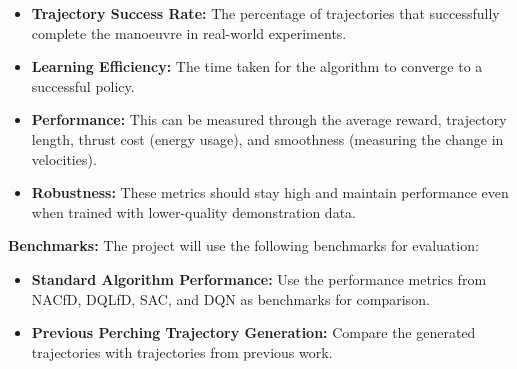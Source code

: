 \begin{itemize}
  \item \textbf{Trajectory Success Rate: } The percentage of trajectories that successfully complete the manoeuvre in real-world experiments.
  \item \textbf{Learning Efficiency: } The time taken for the algorithm to converge to a successful policy.
  \item \textbf{Performance: } This can be measured through the average reward, trajectory length, thrust cost (energy usage), and smoothness (measuring the change in velocities).
  \item \textbf{Robustness: } These metrics should stay high and maintain performance even when trained with lower-quality demonstration data.
\end{itemize}

\noindent
\textbf{Benchmarks: }
The project will use the following benchmarks for evaluation:
\begin{itemize}
  \item \textbf{Standard Algorithm Performance: } Use the performance metrics from NACfD, DQLfD, SAC, and DQN as benchmarks for comparison.
  \item \textbf{Previous Perching Trajectory Generation: } Compare the generated trajectories with trajectories from previous work.
\end{itemize}

